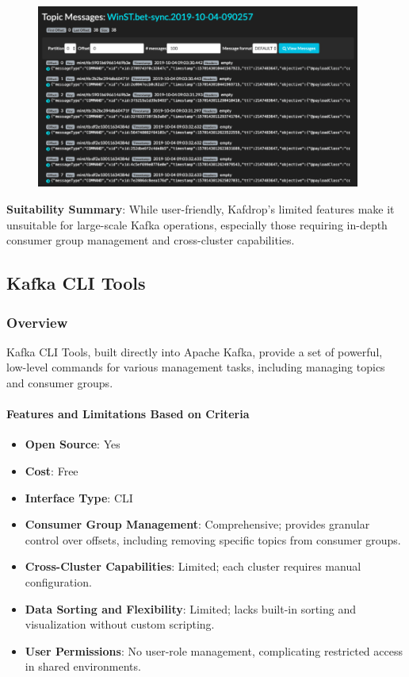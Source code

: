 \documentclass[10pt , a4paper]{report}
\begin{document}
\begin{figure}[htbp]
  \begin{center}
    \includegraphics[width=0.95\textwidth]{imgs/Kafdrop.png}
  \end{center}
  \caption{}\label{fig:}
\end{figure}


\textbf{Suitability Summary}: While user-friendly, Kafdrop’s limited features make it unsuitable for large-scale Kafka operations, especially those requiring in-depth consumer group management and cross-cluster capabilities.

\subsection{Kafka CLI Tools} 
\subsubsection*{Overview} 
Kafka CLI Tools, built directly into Apache Kafka, provide a set of powerful, low-level commands for various management tasks, including managing topics and consumer groups.

\paragraph{Features and Limitations Based on Criteria}
\begin{itemize} 
    \item \small \textbf{Open Source}: Yes
    \item \small \textbf{Cost}: Free
    \item \small \textbf{Interface Type}: CLI
    \item \small \textbf{Consumer Group Management}: Comprehensive; provides granular control over offsets, including removing specific topics from consumer groups.
    \item \small \textbf{Cross-Cluster Capabilities}: Limited; each cluster requires manual configuration.
    \item \small \textbf{Data Sorting and Flexibility}: Limited; lacks built-in sorting and visualization without custom scripting.
    \item \small \textbf{User Permissions}: No user-role management, complicating restricted access in shared environments.
\end{itemize}
\end{document}
